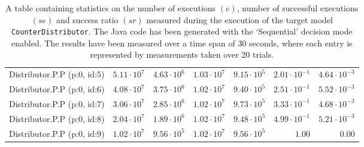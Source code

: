 \begin{table}[htbp]
{\begin{tabular}{lrrrrrr}
\hspace{3mm}Distributor.P.P (p:0, id:5) & $5.11 \cdot 10^{7}$ & $4.63 \cdot 10^{6}$ & $1.03 \cdot 10^{7}$ & $9.15 \cdot 10^{5}$ & $2.01 \cdot 10^{-1}$ & $4.64 \cdot 10^{-3}$ \\
\hspace{3mm}Distributor.P.P (p:0, id:6) & $4.08 \cdot 10^{7}$ & $3.75 \cdot 10^{6}$ & $1.02 \cdot 10^{7}$ & $9.40 \cdot 10^{5}$ & $2.51 \cdot 10^{-1}$ & $5.52 \cdot 10^{-3}$ \\
\hspace{3mm}Distributor.P.P (p:0, id:7) & $3.06 \cdot 10^{7}$ & $2.85 \cdot 10^{6}$ & $1.02 \cdot 10^{7}$ & $9.73 \cdot 10^{5}$ & $3.33 \cdot 10^{-1}$ & $4.68 \cdot 10^{-3}$ \\
\hspace{3mm}Distributor.P.P (p:0, id:8) & $2.04 \cdot 10^{7}$ & $1.89 \cdot 10^{6}$ & $1.02 \cdot 10^{7}$ & $9.48 \cdot 10^{5}$ & $4.99 \cdot 10^{-1}$ & $5.21 \cdot 10^{-3}$ \\
\hspace{3mm}Distributor.P.P (p:0, id:9) & $1.02 \cdot 10^{7}$ & $9.56 \cdot 10^{5}$ & $1.02 \cdot 10^{7}$ & $9.56 \cdot 10^{5}$ &               $1.00$ &               $0.00$ \\
\bottomrule
\end{tabular}
}
\caption{A table containing statistics on the number of executions $(e)$, number of successful executions $(se)$ and success ratio $(sr)$ measured during the execution of the target model \texttt{CounterDistributor}. The Java code has been generated with the `Sequential' decision mode enabled. The results have been measured over a time span of 30 seconds, where each entry is represented by measurements taken over 20 trials.}
\label{table:frequency_results_counterdistributor_sequential}
\end{table}